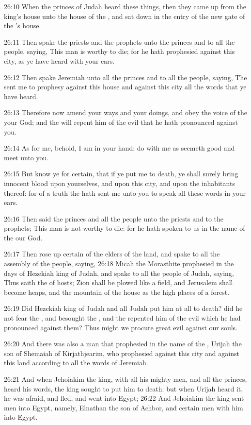 26:10 When the princes of Judah heard these things, then they came up
from the king's house unto the house of the \LORD, and sat down in the
entry of the new gate of the \LORD's house.

26:11 Then spake the priests and the prophets unto the princes and to
all the people, saying, This man is worthy to die; for he hath
prophesied against this city, as ye have heard with your ears.

26:12 Then spake Jeremiah unto all the princes and to all the people,
saying, The \LORD sent me to prophesy against this house and against
this city all the words that ye have heard.

26:13 Therefore now amend your ways and your doings, and obey the
voice of the \LORD your God; and the \LORD will repent him of the evil
that he hath pronounced against you.

26:14 As for me, behold, I am in your hand: do with me as seemeth good
and meet unto you.

26:15 But know ye for certain, that if ye put me to death, ye shall
surely bring innocent blood upon yourselves, and upon this city, and
upon the inhabitants thereof: for of a truth the \LORD hath sent me
unto you to speak all these words in your ears.

26:16 Then said the princes and all the people unto the priests and to
the prophets; This man is not worthy to die: for he hath spoken to us
in the name of the \LORD our God.

26:17 Then rose up certain of the elders of the land, and spake to all
the assembly of the people, saying, 26:18 Micah the Morasthite
prophesied in the days of Hezekiah king of Judah, and spake to all the
people of Judah, saying, Thus saith the \LORD of hosts; Zion shall be
plowed like a field, and Jerusalem shall become heaps, and the
mountain of the house as the high places of a forest.

26:19 Did Hezekiah king of Judah and all Judah put him at all to
death?  did he not fear the \LORD, and besought the \LORD, and the \LORD
repented him of the evil which he had pronounced against them? Thus
might we procure great evil against our souls.

26:20 And there was also a man that prophesied in the name of the
\LORD, Urijah the son of Shemaiah of Kirjathjearim, who prophesied
against this city and against this land according to all the words of
Jeremiah.

26:21 And when Jehoiakim the king, with all his mighty men, and all
the princes, heard his words, the king sought to put him to death: but
when Urijah heard it, he was afraid, and fled, and went into Egypt;
26:22 And Jehoiakim the king sent men into Egypt, namely, Elnathan the
son of Achbor, and certain men with him into Egypt.

